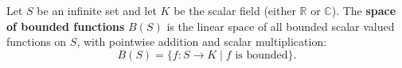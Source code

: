 Let $S$ be an infinite set and let $K$ be the scalar field (either $\mathbb{R}$ or $\mathbb{C}$). The \textbf{space of bounded functions} $B(S)$ is the linear space of all bounded scalar valued functions on $S$, with pointwise addition and scalar multiplication:
$$
B(S) = \{ f : S \to K \mid f \text{ is bounded} \}.
$$
